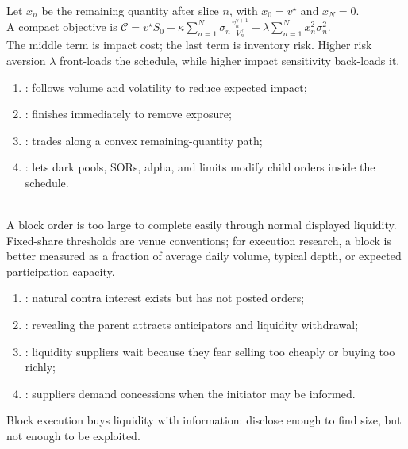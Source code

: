 \begin{model} \\
Let $x_n$ be the remaining quantity after slice $n$, with $x_0=v^\star$ and $x_N=0$.\\
A compact objective is $\mathcal{C} =v^\star S_0 +\kappa\sum\limits_{n=1}^{N}\sigma_n\frac{v_n^{\gamma+1}}{V_n^\gamma} +\lambda\sum\limits_{n=1}^{N}x_n^2\sigma_n^2$.\\
The middle term is impact cost; the last term is inventory risk. Higher risk aversion $\lambda$ front-loads the schedule, while higher impact sensitivity back-loads it.
\end{model}

\begin{taxonomy} 
\begin{enumerate}[label=\roman*.]
\setlength{\itemsep}{0pt}
\item {}: follows volume and volatility to reduce expected impact;
\item {}: finishes immediately to remove exposure;
\item {}: trades along a convex remaining-quantity path;
\item {}: lets dark pools, SORs, alpha, and limits modify child orders inside the schedule.
\end{enumerate}
\end{taxonomy}

\begin{definition} \\
A block order is too large to complete easily through normal displayed liquidity.\\
Fixed-share thresholds are venue conventions; for execution research, a block is better measured as a fraction of average daily volume, typical depth, or expected participation capacity.
\end{definition}

\begin{taxonomy} 
\begin{enumerate}[label=\roman*.]
\setlength{\itemsep}{0pt}
\item {}: natural contra interest exists but has not posted orders;
\item {}: revealing the parent attracts anticipators and liquidity withdrawal;
\item {}: liquidity suppliers wait because they fear selling too cheaply or buying too richly;
\item {}: suppliers demand concessions when the initiator may be informed.
\end{enumerate}
Block execution buys liquidity with information: disclose enough to find size, but not enough to be exploited.
\end{taxonomy}

